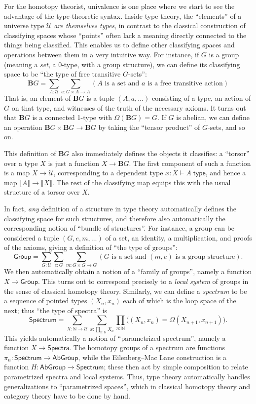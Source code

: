 \documentclass[10pt]{article}
\def\ty{\;\mathsf{type}}
\def\m#1{\llbracket#1\rrbracket}
\def\N{\mathbb{N}}
\def\types{\vdash}
\def\U{\mathscr{U}}
\numberwithin{equation}{section}
\begin{document}
For the homotopy theorist, univalence is one place where we start to see the advantage of the type-theoretic syntax.
Inside type theory, the ``elements'' of a universe type $\U$ \emph{are themselves types}, in contrast to the classical construction of classifying spaces whose ``points'' often lack a meaning directly connected to the things being classified.
This enables us to define other classifying spaces and operations between them in a very intuitive way.
For instance, if $G$ is a group (meaning a \emph{set}, a 0-type, with a group structure), we can define its classifying space to be ``the type of free transitive $G$-sets'':
\[ \mathbf{B}G = \textstyle\sum_{A:\U} \sum_{a:G\times A\to A} (\text{$A$ is a set and $a$ is a free transitive action}) \]
That is, an element of $\mathbf{B}G$ is a tuple $(A,a,\dots)$ consisting of a type, an action of $G$ on that type, and witnesses of the truth of the necessary axioms.
It turns out that $\mathbf{B}G$ is a connected 1-type with $\Omega(\mathbf{B}G) = G$.
If $G$ is abelian, we can define an operation $\mathbf{B}G \times \mathbf{B}G \to \mathbf{B}G$ by taking the ``tensor product'' of $G$-sets, and so on.

This definition of $\mathbf{B}G$ also immediately defines the objects it classifies: a ``torsor'' over a type $X$ is just a function $X \to \mathbf{B}G$.
The first component of such a function is a map $X\to \U$, corresponding to a dependent type $x:X \types A\ty$, and hence a map $\m A \to \m X$.
The rest of the classifying map equips this with the usual structure of a torsor over $X$.

In fact, \emph{any} definition of a structure in type theory automatically defines the classifying space for such structures, and therefore also automatically the corresponding notion of ``bundle of structures''.
For instance, a group can be considered a tuple $(G,e,m,\dots)$ of a set, an identity, a multiplication, and proofs of the axioms, giving a definition of ``the type of groups'':
\[ \mathsf{Group} = \textstyle \sum_{G:\U}\sum_{e:G} \sum_{m:G\times G\to G} (\text{$G$ is a set and $(m,e)$ is a group structure}). \]
We then automatically obtain a notion of a ``family of groups'', namely a function $X\to \mathsf{Group}$.
This turns out to correspond precisely to a \emph{local system} of groups in the sense of classical homotopy theory.
Similarly, we can define a \emph{spectrum} to be a sequence of pointed types $(X_n,x_n)$ each of which is the loop space of the next; thus ``the type of spectra'' is
\[ \mathsf{Spectrum} = \textstyle\sum_{X:\N\to \U} \sum_{x:\prod_{n:\N} X_n} \prod_{n:\N} \big((X_n,x_n) = \Omega(X_{n+1},x_{n+1})\big). \]
This yields automatically a notion of ``parametrized spectrum'', namely a function $X\to \mathsf{Spectra}$.
The homotopy groups of a spectrum are functions $\pi_n:\mathsf{Spectrum} \to \mathsf{AbGroup}$, while the Eilenberg--Mac Lane construction is a function $H : \mathsf{AbGroup} \to \mathsf{Spectrum}$; these then act by simple composition to relate parametrized spectra and local systems.
Thus, type theory automatically handles generalizations to ``parametrized spaces'', which in classical homotopy theory and category theory have to be done by hand.
\end{document}
